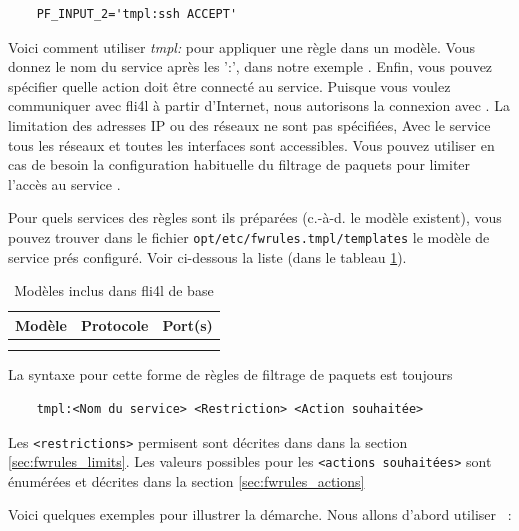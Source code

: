 \begin{example}
\begin{verbatim}
    PF_INPUT_2='tmpl:ssh ACCEPT'
\end{verbatim}
\end{example}

Voici comment utiliser \emph{tmpl:} pour appliquer une règle dans un modèle.
Vous donnez le nom du service après les ':', dans notre exemple .
Enfin, vous pouvez spécifier quelle action doit être connecté au service.
Puisque vous voulez communiquer avec fli4l à partir d'Internet, nous autorisons
la connexion avec . La limitation des adresses IP ou des réseaux
ne sont pas spécifiées, Avec le service  tous les réseaux et toutes
les interfaces sont accessibles. Vous pouvez utiliser en cas de besoin la
configuration habituelle du filtrage de paquets pour limiter l'accès au service
.

Pour quels services des règles sont ils préparées (c.-à-d. le modèle existent),
vous pouvez trouver dans le fichier \verb+opt/etc/fwrules.tmpl/templates+ le
modèle de service prés configuré. Voir ci-dessous la liste (dans le tableau
\ref{tab:fwrules_tmpl}).

\begin{center}
  {\footnotesize
  \begin{longtable}{|lll|}
     \hline
     {\textbf{Modèle}} & {\textbf{Protocole}} & {\textbf{Port(s)}} \\
     \hline\hline
     \endhead
      \\
     \caption{Modèles inclus dans fli4l de base}
     \label{tab:fwrules_tmpl}
  \end{longtable}}
\end{center}

La syntaxe pour cette forme de règles de filtrage de paquets est toujours

\begin{example}
\begin{verbatim}
    tmpl:<Nom du service> <Restriction> <Action souhaitée>
\end{verbatim}
\end{example}

Les \verb+<restrictions>+ permisent sont décrites dans dans la section
\ref{sec:fwrules_limits}. Les valeurs possibles pour les \verb+<actions souhaitées>+
sont énumérées et décrites dans la section \ref{sec:fwrules_actions}

Voici quelques exemples pour illustrer la démarche. Nous allons d'abord
utiliser ~:

